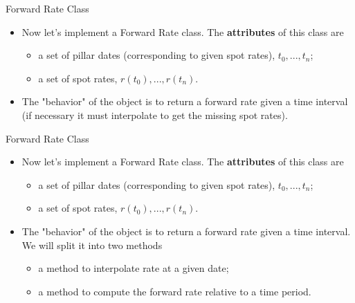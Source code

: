 \documentclass{beamer}
\begin{document}
\begin{frame}{Forward Rate Class}
  \begin{itemize}
  \item Now let's implement a Forward Rate class. The \textbf{attributes} of this class are
      \begin{itemize}
      \item a set of pillar dates (corresponding to given spot rates), $t_0,...,t_{n}$;
      \item a set of spot rates, $r(t_0),...,r(t_{n})$.
      \end{itemize}
  \item The "behavior" of the object is to return a forward rate given a time interval (if necessary it must interpolate to get the missing spot rates).
  \end{itemize}
\end{frame}

\begin{frame}{Forward Rate Class}
  \begin{itemize}
  \item Now let's implement a Forward Rate class. The \textbf{attributes} of this class are
      \begin{itemize}
      \item a set of pillar dates (corresponding to given spot rates), $t_0,...,t_{n}$;
      \item a set of spot rates, $r(t_0),...,r(t_{n})$.
      \end{itemize}
  \item The "behavior" of the object is to return a forward rate given a time interval. We will split it into two methods
    \begin{itemize}
    \item a method to interpolate rate at a given date; 
    \item a method to compute the forward rate relative to a time period.
    \end{itemize}
  \end{itemize}
\end{frame}
\end{document}
